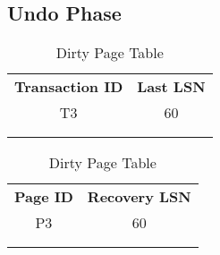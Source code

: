 \subsection{Undo Phase}
\begin{table}[H]
    \begin{minipage}{.5\linewidth}
      \centering
		\begin{tabular}{|c|c|}
		\cline{1-2}
		\textbf{Transaction ID} & \textbf{Last LSN} \\ \cline{1-2}
		T3             & 60       \\ \cline{1-2}
		               &          \\ \cline{1-2}
		               &          \\ \cline{1-2}
		\end{tabular}
      \caption{Transaction Table}

    \end{minipage}%
    \begin{minipage}{.5\linewidth}
      \centering
		\begin{tabular}{|c|c|}
		\cline{1-2}
		\textbf{Page ID} & \textbf{Recovery LSN} \\ \cline{1-2}
		P3      & 60           \\ \cline{1-2}
		        &              \\ \cline{1-2}
		        &              \\ \cline{1-2}
		\end{tabular}
        \caption{Dirty Page Table}

    \end{minipage} 
\end{table}